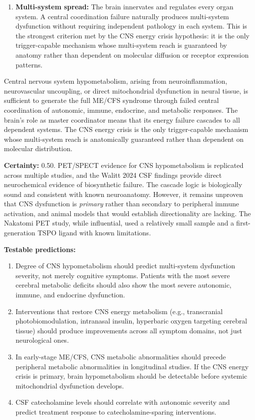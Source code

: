 \begin{enumerate}
    \item \textbf{Multi-system spread:} The brain innervates and regulates every organ system. A central coordination failure naturally produces multi-system dysfunction without requiring independent pathology in each system. This is the strongest criterion met by the CNS energy crisis hypothesis: it is the only trigger-capable mechanism whose multi-system reach is guaranteed by anatomy rather than dependent on molecular diffusion or receptor expression patterns.
\end{enumerate}

\begin{hypothesis}
\label{hyp:cns-energy-root}
Central nervous system hypometabolism, arising from neuroinflammation, neurovascular uncoupling, or direct mitochondrial dysfunction in neural tissue, is sufficient to generate the full ME/CFS syndrome through failed central coordination of autonomic, immune, endocrine, and metabolic responses. The brain's role as master coordinator means that its energy failure cascades to all dependent systems. The CNS energy crisis is the only trigger-capable mechanism whose multi-system reach is anatomically guaranteed rather than dependent on molecular distribution.

\textbf{Certainty:} 0.50. PET/SPECT evidence for CNS hypometabolism is replicated across multiple studies, and the Walitt 2024 CSF findings provide direct neurochemical evidence of biosynthetic failure. The cascade logic is biologically sound and consistent with known neuroanatomy. However, it remains unproven that CNS dysfunction is \emph{primary} rather than secondary to peripheral immune activation, and animal models that would establish directionality are lacking. The Nakatomi PET study, while influential, used a relatively small sample and a first-generation TSPO ligand with known limitations.

\textbf{Testable predictions:}
\begin{enumerate}
    \item Degree of CNS hypometabolism should predict multi-system dysfunction severity, not merely cognitive symptoms. Patients with the most severe cerebral metabolic deficits should also show the most severe autonomic, immune, and endocrine dysfunction.
    \item Interventions that restore CNS energy metabolism (e.g., transcranial photobiomodulation, intranasal insulin, hyperbaric oxygen targeting cerebral tissue) should produce improvements across all symptom domains, not just neurological ones.
    \item In early-stage ME/CFS, CNS metabolic abnormalities should precede peripheral metabolic abnormalities in longitudinal studies. If the CNS energy crisis is primary, brain hypometabolism should be detectable before systemic mitochondrial dysfunction develops.
    \item CSF catecholamine levels should correlate with autonomic severity and predict treatment response to catecholamine-sparing interventions.
\end{enumerate}


\end{hypothesis}
